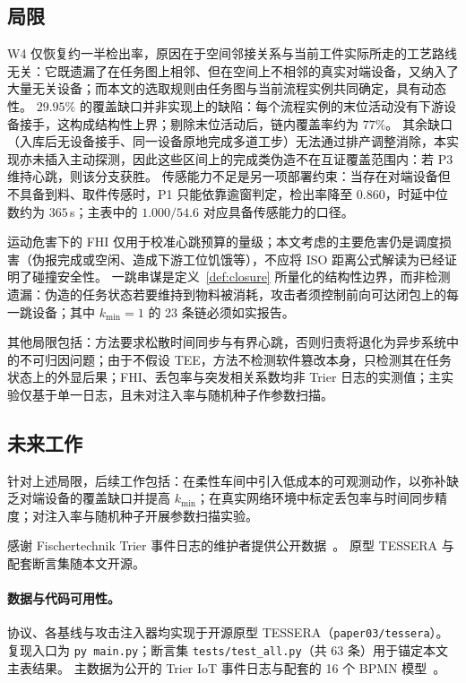 \documentclass[manuscript,screen,review]{acmart}
\begin{document}
\subsection{局限}
\label{sec:discussion}

W4 仅恢复约一半检出率，原因在于空间邻接关系与当前工件实际所走的工艺路线无关：它既遗漏了在任务图上相邻、但在空间上不相邻的真实对端设备，又纳入了大量无关设备；而本文的选取规则由任务图与当前流程实例共同确定，具有动态性。
$29.95\%$ 的覆盖缺口并非实现上的缺陷：每个流程实例的末位活动没有下游设备接手，这构成结构性上界；剔除末位活动后，链内覆盖率约为 $77\%$。
其余缺口（入库后无设备接手、同一设备原地完成多道工步）无法通过排产调整消除，本实现亦未插入主动探测，因此这些区间上的完成类伪造不在互证覆盖范围内：若 P3 维持心跳，则该分支获胜。
传感能力不足是另一项部署约束：当存在对端设备但不具备到料、取件传感时，P1 只能依靠逾窗判定，检出率降至 $0.860$，时延中位数约为 $365$\,s；主表中的 $1.000/54.6$ 对应具备传感能力的口径。

运动危害下的 FHI 仅用于校准心跳预算的量级；本文考虑的主要危害仍是调度损害（伪报完成或空闲、造成下游工位饥饿等），不应将 ISO 距离公式解读为已经证明了碰撞安全性。
一跳串谋是定义~\ref{def:closure} 所量化的结构性边界，而非检测遗漏：伪造的任务状态若要维持到物料被消耗，攻击者须控制前向可达闭包上的每一跳设备；其中 $k_{\min}{=}1$ 的 23 条链必须如实报告。

其他局限包括：方法要求松散时间同步与有界心跳，否则归责将退化为异步系统中的不可归因问题；由于不假设 TEE，方法不检测软件篡改本身，只检测其在任务状态上的外显后果；FHI、丢包率与突发相关系数均非 Trier 日志的实测值；主实验仅基于单一日志，且未对注入率与随机种子作参数扫描。

\subsection{未来工作}
\label{sec:future}

针对上述局限，后续工作包括：在柔性车间中引入低成本的可观测动作，以弥补缺乏对端设备的覆盖缺口并提高 $k_{\min}$；在真实网络环境中标定丢包率与时间同步精度；对注入率与随机种子开展参数扫描实验。

\begin{acks}
感谢 Fischertechnik Trier 事件日志的维护者提供公开数据~\cite{trier2022}。
原型 TESSERA 与配套断言集随本文开源。
\end{acks}

\paragraph{数据与代码可用性。}
协议、各基线与攻击注入器均实现于开源原型 TESSERA（\texttt{paper03/tessera}）。
复现入口为 \texttt{py main.py}；断言集 \texttt{tests/test\_all.py}（共 63 条）用于锚定本文主表结果。
主数据为公开的 Trier IoT 事件日志与配套的 16 个 BPMN 模型~\cite{trier2022}。
\end{document}
